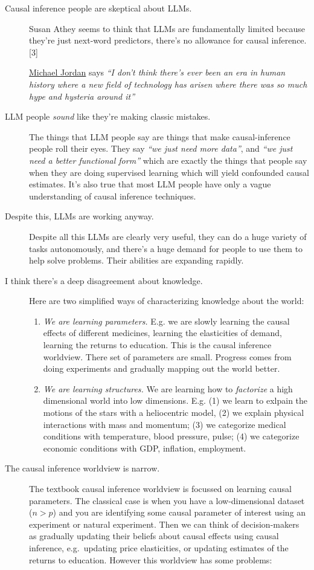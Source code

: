 \documentclass[
  10pt,
  letterpaper,
  DIV=11,
  numbers=noendperiod,
  oneside]{scrartcl}
\begin{document}
\begin{description}
\item[Causal inference people are skeptical about LLMs.]
Susan Athey seems to think that LLMs are fundamentally limited because
they're just next-word predictors, there's no allowance for causal
inference.{[}3{]}

\href{https://www.youtube.com/live/W0QLq4qEmKg?t=3810s}{Michael Jordan}
says \emph{``I don't think there's ever been an era in human history
where a new field of technology has arisen where there was so much hype
and hysteria around it''}
\item[LLM people \emph{sound} like they're making classic mistakes.]
The things that LLM people say are things that make causal-inference
people roll their eyes. They say \emph{``we just need more data''}, and
\emph{``we just need a better functional form''} which are exactly the
things that people say when they are doing supervised learning which
will yield confounded causal estimates. It's also true that most LLM
people have only a vague understanding of causal inference techniques.
\item[Despite this, LLMs are working anyway.]
Despite all this LLMs are clearly very useful, they can do a huge
variety of tasks autonomously, and there's a huge demand for people to
use them to help solve problems. Their abilities are expanding rapidly.
\item[I think there's a deep disagreement about knowledge.]
Here are two simplified ways of characterizing knowledge about the
world:

\begin{enumerate}
\def\labelenumi{\arabic{enumi}.}
\item
  \emph{We are learning parameters.} E.g. we are slowly learning the
  causal effects of different medicines, learning the elasticities of
  demand, learning the returns to education. This is the causal
  inference worldview. There set of parameters are small. Progress comes
  from doing experiments and gradually mapping out the world better.
\item
  \emph{We are learning structures.} We are learning how to
  \emph{factorize} a high dimensional world into low dimensions. E.g.
  (1) we learn to exlpain the motions of the stars with a heliocentric
  model, (2) we explain physical interactions with mass and momentum;
  (3) we categorize medical conditions with temperature, blood pressure,
  pulse; (4) we categorize economic conditions with GDP, inflation,
  employment.
\end{enumerate}
\item[The causal inference worldview is narrow.]
The textbook causal inference worldview is focussed on learning causal
parameters. The classical case is when you have a low-dimensional
dataset (\(n>p\)) and you are identifying some causal parameter of
interest using an experiment or natural experiment. Then we can think of
decision-makers as gradually updating their beliefs about causal effects
using causal inference, e.g.~updating price elasticities, or updating
estimates of the returns to education. However this worldview has some
problems:


\end{description}
\end{document}
